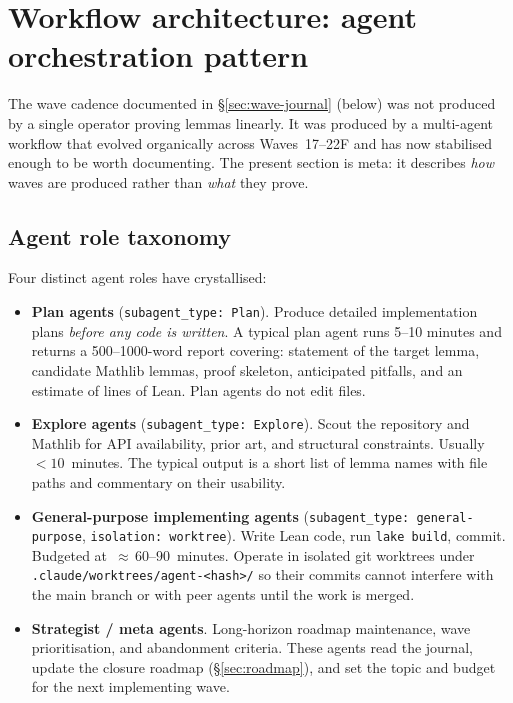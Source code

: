 \documentclass[11pt,a4paper]{article}
\newcommand{\cmd}[1]{\texttt{\small #1}}
\theoremstyle{plain}
\theoremstyle{definition}
\begin{document}
\section{Workflow architecture: agent orchestration pattern}\label{sec:workflow}

The wave cadence documented in \S\ref{sec:wave-journal} (below) was not
produced by a single operator proving lemmas linearly. It was
produced by a multi-agent workflow that evolved organically across
Waves~17--22F and has now stabilised enough to be worth documenting.
The present section is meta: it describes \emph{how} waves are produced
rather than \emph{what} they prove.

\subsection{Agent role taxonomy}

Four distinct agent roles have crystallised:

\begin{itemize}[leftmargin=1.3em]
  \item \textbf{Plan agents} (\cmd{subagent\_type: Plan}). Produce
        detailed implementation plans \emph{before any code is written}.
        A typical plan agent runs 5--10 minutes and returns a
        500--1000-word report covering: statement of the target lemma,
        candidate Mathlib lemmas, proof skeleton, anticipated pitfalls,
        and an estimate of lines of Lean. Plan agents do not edit files.
  \item \textbf{Explore agents} (\cmd{subagent\_type: Explore}). Scout
        the repository and Mathlib for API availability, prior art,
        and structural constraints. Usually~$<10$~minutes. The typical
        output is a short list of lemma names with file paths and
        commentary on their usability.
  \item \textbf{General-purpose implementing agents}
        (\cmd{subagent\_type: general-purpose}, \cmd{isolation:
        worktree}). Write Lean code, run \cmd{lake build}, commit.
        Budgeted at~${\approx}\,60$--$90$~minutes. Operate in
        isolated git worktrees under
        \cmd{.claude/worktrees/agent-<hash>/} so their commits cannot
        interfere with the main branch or with peer agents until the
        work is merged.
  \item \textbf{Strategist / meta agents}. Long-horizon roadmap
        maintenance, wave prioritisation, and abandonment criteria.
        These agents read the journal, update the closure roadmap
        (\S\ref{sec:roadmap}), and set the topic and budget for the
        next implementing wave.
\end{itemize}
\end{document}
